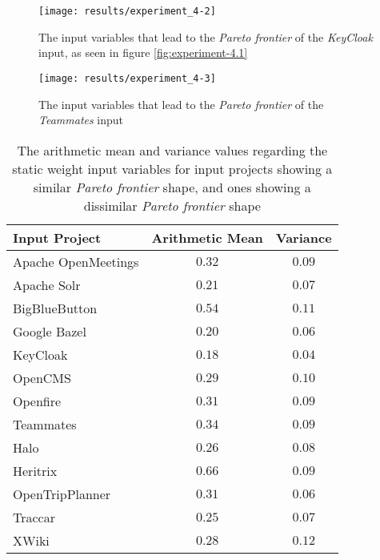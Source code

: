 \documentclass[12pt,a4paper]{report}
\begin{document}
\begin{figure}[htbp]
\centering
\texttt{[image: results/experiment\_4-2]}
\caption{The input variables that lead to the \textit{Pareto frontier} of the \textit{KeyCloak} input, as seen in figure \ref{fig:experiment-4.1}}
\label{fig:experiment-4.2}
\end{figure}

\begin{figure}[htbp]
\centering
\texttt{[image: results/experiment\_4-3]}
\caption{The input variables that lead to the \textit{Pareto frontier} of the \textit{Teammates} input}
\label{fig:experiment-4.3}
\end{figure}

\begin{table}[h!]
\def\arraystretch{1.55}
\begin{tabularx}{\textwidth}{|X|c|c|}
\hline
Input Project & Arithmetic Mean & Variance \\
\hline\hline

Apache OpenMeetings & $0.32$ & $0.09$ \\\hline
Apache Solr         & $0.21$ & $0.07$ \\\hline
BigBlueButton       & $0.54$ & $0.11$ \\\hline
Google Bazel        & $0.20$ & $0.06$ \\\hline
KeyCloak            & $0.18$ & $0.04$ \\\hline
OpenCMS             & $0.29$ & $0.10$ \\\hline
Openfire            & $0.31$ & $0.09$ \\\hline
Teammates           & $0.34$ & $0.09$ \\\hline
\hline\hline
Halo                & $0.26$ & $0.08$ \\\hline
Heritrix            & $0.66$ & $0.09$ \\\hline
OpenTripPlanner     & $0.31$ & $0.06$ \\\hline
Traccar             & $0.25$ & $0.07$ \\\hline
XWiki               & $0.28$ & $0.12$ \\\hline

\end{tabularx}
\caption{The arithmetic mean and variance values regarding the static weight input variables for input projects showing a similar \textit{Pareto frontier} shape, and ones showing a dissimilar \textit{Pareto frontier} shape}
\label{table:experiment-4.4}
\end{table}
\end{document}
